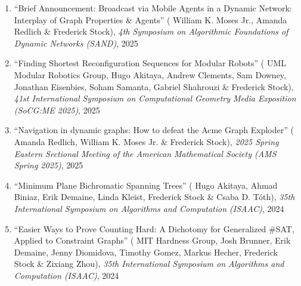 \documentclass[letterpaper,11pt]{article}
\makeatletter
\newcommand{\publication}[6]{
  \item ``#1'' %
   (\ignorespaces#2), %
     \emph{#3}, %
      #4%


}
\newcommand{\pdficon}{\faFilePdf}
\newcommand{\codeicon}{\faCode}
\newcommand{\doilabel}{\texttt{DOI}}
\makeatother
\begin{document}
\begin{enumerate}
        \publication
          {Brief Announcement: Broadcast via Mobile Agents in a Dynamic Network: Interplay of Graph Properties \& Agents}
          {
 William K. Moses Jr., Amanda Redlich \& Frederick Stock}
          {4th Symposium on Algorithmic Foundations of Dynamic Networks (SAND)}
          {2025}
          {%
\href{fred-stock.github.io/docstore/Broadcast_via_Mobile_Agents_in_a_Dynamic_Network-sand.pdf}{\pdficon}%
%
\quad\href{https://doi.org/10.4230/LIPIcs.SAND.2025.17}{\doilabel}%
          }
          {12}
 \vspace{-.5em}  
      
        \publication
          {Finding Shortest Reconfiguration Sequences for Modular Robots}
          {
 UML Modular Robotics Group, Hugo Akitaya, Andrew Clements, Sam Downey, Jonathan Eisenbies, Soham Samanta, Gabriel Shahrouzi \& Frederick Stock}
          {41st International Symposium on Computational Geometry Media Exposition (SoCG:ME 2025)}
          {2025}
          {%
\href{fred-stock.github.io/docstore/Finding-Shortest-Reconfig-Sequences-SOCGME.pdf}{\pdficon}%
\quad\href{https://github.com/Modular-Robotics-Group/modular-robotics}{\codeicon}%
\quad\href{https://doi.org/10.4230/LIPIcs.SoCG.2025.85}{\doilabel}%
          }
          {13}
 \vspace{-.5em}  
      
        \publication
          {Navigation in dynamic graphs: How to defeat the Acme Graph Exploder}
          {
 Amanda Redlich, William K. Moses Jr. \& Frederick Stock}
          {2025 Spring Eastern Sectional Meeting of the American Mathematical Society (AMS Spring 2025)}
          {2025}
          {%
%
%
%
          }
          {14}
 \vspace{-.5em}  
      
        \publication
          {Minimum Plane Bichromatic Spanning Trees}
          {
 Hugo Akitaya, Ahmad Biniaz, Erik Demaine, Linda Kleist, Frederick Stock \& Csaba D. Tóth}
          {35th International Symposium on Algorithms and Computation (ISAAC)}
          {2024}
          {%
\href{fred-stock.github.io/docstore/MPBST-ISAAC.pdf}{\pdficon}%
%
\quad\href{https://doi.org/10.4230/LIPIcs.ISAAC.2024.4}{\doilabel}%
          }
          {15}
 \vspace{-.5em}  
      
        \publication
          {Easier Ways to Prove Counting Hard: A Dichotomy for Generalized \#SAT, Applied to Constraint Graphs}
          {
 MIT Hardness Group, Josh Brunner, Erik Demaine, Jenny Diomidova, Timothy Gomez, Markus Hecher, Frederick Stock \& Zixiang Zhou}
          {35th International Symposium on Algorithms and Computation (ISAAC)}
          {2024}
          {%
\href{fred-stock.github.io/docstore/Easier-Ways-Hard-Counting-ISAAC.pdf}{\pdficon}%
%
\quad\href{https://doi.org/10.4230/LIPIcs.ISAAC.2024.51}{\doilabel}%
          }
          {16}
 \vspace{-.5em}  
      

\end{enumerate}
\end{document}
